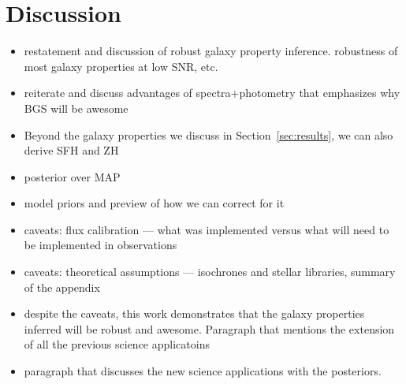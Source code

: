 \section{Discussion} \label{sec:discuss}
\begin{itemize}
    \item restatement and discussion of robust galaxy property inference.
        robustness of most galaxy properties at low SNR, etc. 
    \item reiterate and discuss advantages of spectra+photometry that
        emphasizes why BGS will be awesome
    \item Beyond the galaxy properties we discuss in Section~\ref{sec:results},
        we can also derive SFH and ZH
    \item posterior over MAP
    \item model priors and preview of how we can correct for it
    \item caveats: flux calibration --- what was implemented versus what will
        need to be implemented in observations
    \item caveats: theoretical assumptions --- isochrones and stellar
        libraries, summary of the appendix
    \item despite the caveats, this work demonstrates that the galaxy
        properties inferred will be robust and awesome. Paragraph that mentions
        the extension of all the previous science applicatoins 
    \item paragraph that discusses the new science applications with the
        posteriors. 
\end{itemize}

